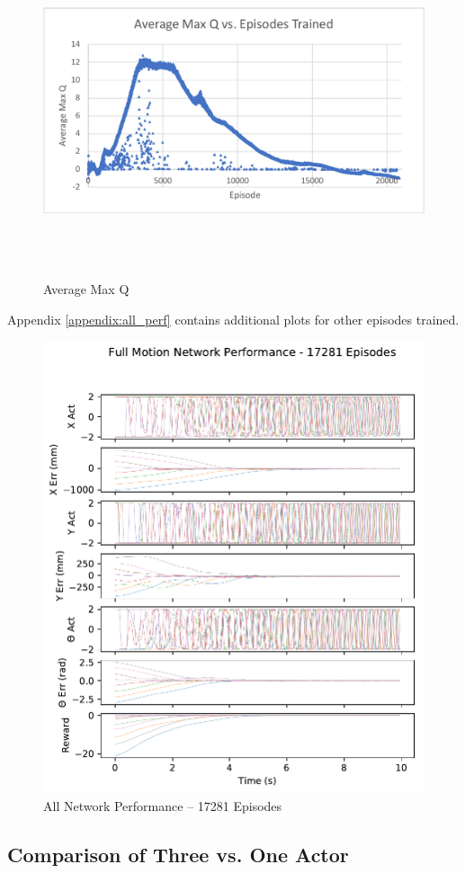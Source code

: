 \begin{figure}[H]
	\includegraphics[width=6in, height=3.85in, keepaspectratio]{figures/train_figs/all_q.pdf}
	\caption{Average Max Q} \label{fig:all_q}
\end{figure}

Appendix \ref{appendix:all_perf} contains additional plots for other episodes trained.
\begin{figure}[H]
	\centering
	\includegraphics[width=6in,  keepaspectratio]{figures/train_figs/all_transitions/3_17281.pdf}
	\caption{All Network Performance -- 17281 Episodes}\label{fig:all_perf}
\end{figure}

\subsection{Comparison of Three vs. One Actor}
